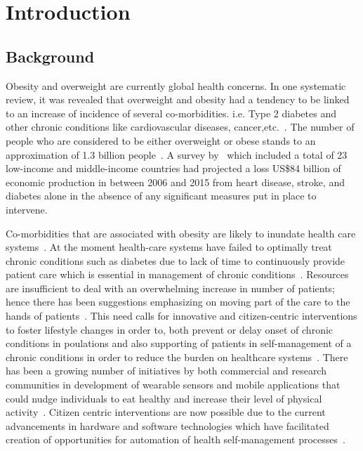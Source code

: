 
\chapter{Introduction} %

\label{introductionchapter} %


\section{Background}
Obesity and overweight are currently global health concerns. In one systematic review, it was revealed that overweight and obesity had a tendency to be linked to an increase of incidence of several co-morbidities. i.e. Type 2 diabetes and other chronic conditions like cardiovascular diseases, cancer,etc.~\citep{guh2009incidence}. The number of people who are considered to be either overweight or obese stands to an approximation of  1.3 billion people~\citep{steyn2006chronic}. A survey by~\cite{abegunde:theburden} which included a total of 23 low-income and middle-income countries had projected a loss US\$84 billion of economic production in between 2006 and 2015 from heart disease, stroke, and diabetes alone in the absence of any significant measures put in place to intervene.

Co-morbidities that are associated with obesity are likely to inundate health care systems~\citep{pollak2010s}. At the moment health-care systems have failed to optimally treat chronic conditions such as diabetes due to lack of time to continuously provide  patient  care which is essential in management of chronic conditions~\citep{quinn2008welldoc}. Resources are insufficient to deal with an overwhelming increase in number of patients; hence there has been suggestions emphasizing on moving part of the care to the hands of patients~\citep{aarsand2012mobile}. This need calls for innovative and citizen-centric  interventions to foster lifestyle changes in order to, both prevent or delay onset of chronic conditions in poulations and also supporting of patients in self-management of a chronic conditions in order to reduce the burden on healthcare systems~\citep{korhonen2010personal,aarsand2012mobile,higgins2016smartphone}. There has been a growing number of initiatives by both commercial and research communities in development of wearable sensors and mobile applications that could nudge individuals to eat healthy and increase their level of physical activity~\citep{chen2014healthytogether}. Citizen centric interventions are now possible due to the current advancements in hardware and software technologies which have facilitated creation of opportunities for automation of health self-management processes~\citep{arsand:mobile}. 

